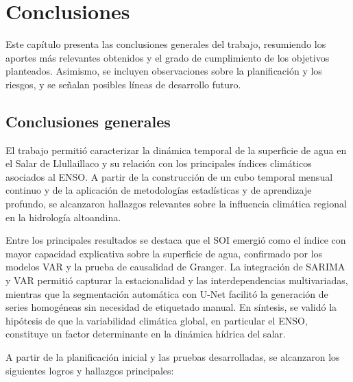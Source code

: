 
\chapter{Conclusiones} %

\label{Chapter5} %
Este capítulo presenta las conclusiones generales del trabajo, resumiendo los aportes más relevantes obtenidos y el grado de cumplimiento de los objetivos planteados. Asimismo, se incluyen observaciones sobre la planificación y los riesgos, y se señalan posibles líneas de desarrollo futuro. 


\section{Conclusiones generales }
El trabajo permitió caracterizar la dinámica temporal de la superficie de agua en el Salar de Llullaillaco y su relación con los principales índices climáticos asociados al ENSO. A partir de la construcción de un cubo temporal mensual continuo y de la aplicación de metodologías estadísticas y de aprendizaje profundo, se alcanzaron hallazgos relevantes sobre la influencia climática regional en la hidrología altoandina. 

Entre los principales resultados se destaca que el SOI emergió como el índice con mayor capacidad explicativa sobre la superficie de agua, confirmado por los modelos VAR y la prueba de causalidad de Granger. La integración de SARIMA y VAR permitió capturar la estacionalidad y las interdependencias multivariadas, mientras que la segmentación automática con U-Net facilitó la generación de series homogéneas sin necesidad de etiquetado manual. En síntesis, se validó la hipótesis de que la variabilidad climática global, en particular el ENSO, constituye un factor determinante en la dinámica hídrica del salar.


A partir de la planificación inicial y las pruebas desarrolladas, se alcanzaron los siguientes logros y hallazgos principales:

